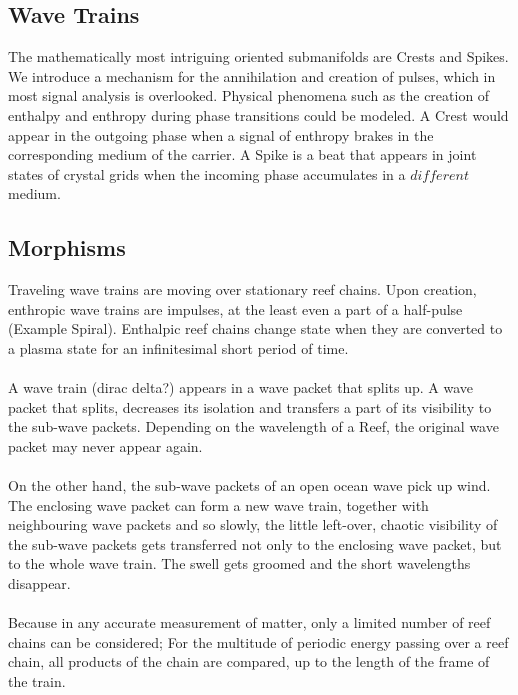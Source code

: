 \documentclass{article}
\begin{document}
\subsection{Wave Trains}
The mathematically most intriguing oriented submanifolds are Crests and Spikes. We introduce a mechanism for the annihilation and creation of pulses, which in most signal analysis is overlooked. Physical phenomena such as the creation of enthalpy and enthropy during phase transitions could be modeled. A Crest would appear in the outgoing phase when a signal of enthropy brakes in the corresponding medium of the carrier. A Spike is a beat that appears in joint states of crystal grids when the incoming phase accumulates in a $different$ medium.

\subsection{Morphisms}
Traveling wave trains are moving over stationary reef chains. Upon creation, enthropic wave trains are impulses, at the least even a part of a half-pulse (Example Spiral). Enthalpic reef chains change state when they are converted to a plasma state for an infinitesimal short period of time.\\\\
A wave train (dirac delta?) appears in a wave packet that splits up. A wave packet that splits, decreases its isolation and transfers a part of its visibility to the sub-wave packets. Depending on the wavelength of a Reef, the original wave packet may never appear again.\\\\
On the other hand, the sub-wave packets of an open ocean wave pick up wind. The enclosing wave packet can form a new wave train, together with neighbouring wave packets and so slowly, the little left-over, chaotic visibility of the sub-wave packets gets transferred not only to the enclosing wave packet, but to the whole wave train. The swell gets groomed and the short wavelengths disappear.\\\\
Because in any accurate measurement of matter, only a limited number of reef chains can be considered; For the multitude of periodic energy passing over a reef chain, all products of the chain are compared, up to the length of the frame of the train.

\printbibliography
\end{document}
